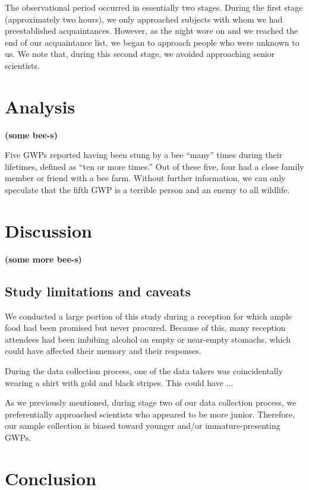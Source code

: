 \documentclass[aps,prl,preprint,groupedaddress,twocolumn]{revtex4-1}
\begin{document}
The observational period occurred in essentially two stages. During the
first stage (approximately two hours), we only approached subjects with
whom we had preestablished acquaintances. However, as the night wore on
and we reached the end of our acquaintance list, we began to approach
people who were unknown to us. We note that, during this second stage,
we avoided approaching senior scientists.


\section{Analysis}

\textbf{(some bee-s)}

Five GWPs reported having been stung by a bee ``many'' times during
their lifetimes, defined as ``ten or more times.'' Out of these five,
four had a close family member or friend with a bee farm. Without further
information, we can only speculate that the fifth GWP is a terrible
person and an enemy to all wildlife.


\section{Discussion}

\textbf{(some more bee-s)}

\subsection{Study limitations and caveats}

We conducted a large portion of this study during a
reception for which ample food had been
promised but never procured. Because of this, many reception attendees
had been imbibing alcohol on empty or near-empty stomachs, which could
have affected their memory and their responses.

During the data collection process, one of the data takers was
coincidentally wearing a shirt with gold and black stripes. This could
have ...

As we previously mentioned, during stage two of our data collection process,
we preferentially approached scientists who appeared to be more junior.
Therefore, our sample collection is biased toward younger and/or
immature-presenting GWPs.

\section{Conclusion}
\end{document}

